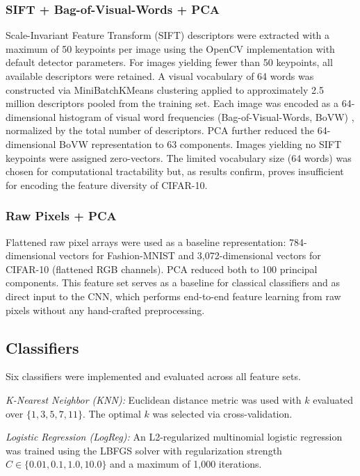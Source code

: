 \documentclass[conference]{IEEEtran}
\begin{document}
\subsubsection{SIFT + Bag-of-Visual-Words + PCA}
Scale-Invariant Feature Transform (SIFT) \cite{lowe2004distinctive} descriptors were extracted with a maximum of 50 keypoints per image using the OpenCV implementation with default detector parameters. For images yielding fewer than 50 keypoints, all available descriptors were retained. A visual vocabulary of 64 words was constructed via MiniBatchKMeans clustering applied to approximately 2.5 million descriptors pooled from the training set. Each image was encoded as a 64-dimensional histogram of visual word frequencies (Bag-of-Visual-Words, BoVW) \cite{csurka2004visual}, normalized by the total number of descriptors. PCA further reduced the 64-dimensional BoVW representation to 63 components. Images yielding no SIFT keypoints were assigned zero-vectors. The limited vocabulary size (64 words) was chosen for computational tractability but, as results confirm, proves insufficient for encoding the feature diversity of CIFAR-10.

\subsubsection{Raw Pixels + PCA}
Flattened raw pixel arrays were used as a baseline representation: 784-dimensional vectors for Fashion-MNIST and 3,072-dimensional vectors for CIFAR-10 (flattened RGB channels). PCA reduced both to 100 principal components. This feature set serves as a baseline for classical classifiers and as direct input to the CNN, which performs end-to-end feature learning from raw pixels without any hand-crafted preprocessing.

\subsection{Classifiers}

Six classifiers were implemented and evaluated across all feature sets.

\textit{K-Nearest Neighbor (KNN):} Euclidean distance metric was used with $k$ evaluated over $\{1, 3, 5, 7, 11\}$. The optimal $k$ was selected via cross-validation.

\textit{Logistic Regression (LogReg):} An L2-regularized multinomial logistic regression was trained using the LBFGS solver with regularization strength $C \in \{0.01, 0.1, 1.0, 10.0\}$ and a maximum of 1,000 iterations.
\end{document}
